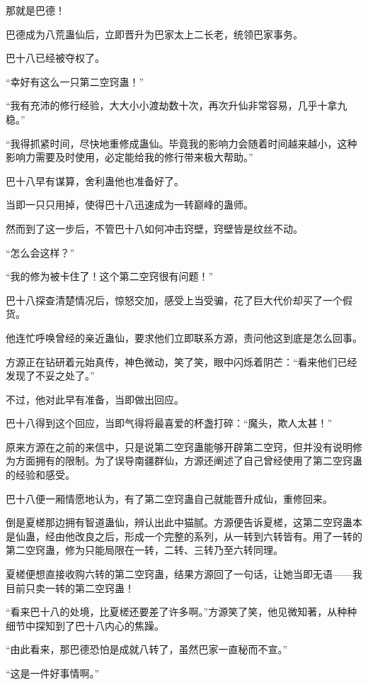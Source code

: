 \begin{this_body}
那就是巴德！

巴德成为八荒蛊仙后，立即晋升为巴家太上二长老，统领巴家事务。

巴十八已经被夺权了。

“幸好有这么一只第二空窍蛊！”

“我有充沛的修行经验，大大小小渡劫数十次，再次升仙非常容易，几乎十拿九稳。”

“我得抓紧时间，尽快地重修成蛊仙。毕竟我的影响力会随着时间越来越小，这种影响力需要及时使用，必定能给我的修行带来极大帮助。”

巴十八早有谋算，舍利蛊他也准备好了。

当即一只只用掉，使得巴十八迅速成为一转巅峰的蛊师。

然而到了这一步后，不管巴十八如何冲击窍壁，窍壁皆是纹丝不动。

“怎么会这样？”

“我的修为被卡住了！这个第二空窍很有问题！”

巴十八探查清楚情况后，惊怒交加，感受上当受骗，花了巨大代价却买了一个假货。

他连忙呼唤曾经的亲近蛊仙，要求他们立即联系方源，责问他这到底是怎么回事。

方源正在钻研着元始真传，神色微动，笑了笑，眼中闪烁着阴芒：“看来他们已经发现了不妥之处了。”

不过，他对此早有准备，当即做出回应。

巴十八得到这个回应，当即气得将最喜爱的杯盏打碎：“魔头，欺人太甚！”

原来方源在之前的来信中，只是说第二空窍蛊能够开辟第二空窍，但并没有说明修为方面拥有的限制。为了误导南疆群仙，方源还阐述了自己曾经使用了第二空窍蛊的经验和感受。

巴十八便一厢情愿地认为，有了第二空窍蛊自己就能晋升成仙，重修回来。

倒是夏槎那边拥有智道蛊仙，辨认出此中猫腻。方源便告诉夏槎，这第二空窍蛊本是仙蛊，经由他改良之后，形成一个完整的系列，从一转到六转皆有。用了一转的第二空窍蛊，修为只能局限在一转，二转、三转乃至六转同理。

夏槎便想直接收购六转的第二空窍蛊，结果方源回了一句话，让她当即无语——我目前只卖一转的第二空窍蛊！

“看来巴十八的处境，比夏槎还要差了许多啊。”方源笑了笑，他见微知著，从种种细节中探知到了巴十八内心的焦躁。

“由此看来，那巴德恐怕是成就八转了，虽然巴家一直秘而不宣。”

“这是一件好事情啊。”


\end{this_body}
